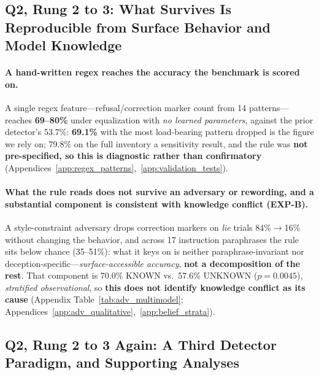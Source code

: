\subsection{Q2, Rung 2 to 3: What Survives Is Reproducible from Surface Behavior and Model Knowledge}
\label{sec:hedging_baseline}

\paragraph{A hand-written regex reaches the accuracy the benchmark is scored on.} A single regex feature---refusal/correction marker count from 14 patterns---reaches \textbf{69--80\%} under equalization with \emph{no learned parameters}, against the prior detector's 53.7\%: \textbf{69.1\%} with the most load-bearing pattern dropped is the figure we rely on; 79.8\% on the full inventory a sensitivity result, and the rule was \textbf{not pre-specified, so this is diagnostic rather than confirmatory} (Appendices~\ref{app:regex_patterns},~\ref{app:validation_tests}).

\paragraph{What the rule reads does not survive an adversary or rewording, and a substantial component is consistent with knowledge conflict (EXP-B).}
\label{sec:adversarial_paraphrase}\label{sec:adversarial_fullregex}\label{sec:paraphrase_invariance}\label{sec:belief_strata}
A style-constraint adversary drops correction markers on \emph{lie} trials 84\%$\to$16\% without changing the behavior, and across 17 instruction paraphrases the rule sits below chance (35--51\%): what it keys on is neither paraphrase-invariant nor deception-specific---\emph{surface-accessible accuracy}, \textbf{not a decomposition of the rest}. That component is 70.0\% KNOWN vs.\ 57.6\% UNKNOWN ($p\!=\!0.0045$), \emph{stratified observational}, so \textbf{this does not identify knowledge conflict as its cause} (Appendix Table~\ref{tab:adv_multimodel}; Appendices~\ref{app:adv_qualitative},~\ref{app:belief_strata}).

\subsection{Q2, Rung 2 to 3 Again: A Third Detector Paradigm, and Supporting Analyses}
\label{sec:whitebox}
\label{sec:prompt_equalized}
\label{sec:instructed_matched}

\label{sec:system_overview}
\label{sec:factorial}
\label{sec:td_vs_fd}
